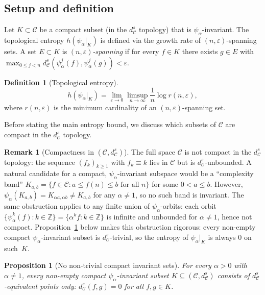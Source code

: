 \documentclass[11pt,a4paper]{article}
\theoremstyle{plain}
\newtheorem{propositioninner}[theoreminner]{Proposition}
\theoremstyle{definition}
\newtheorem{definitioninner}[theoreminner]{Definition}
\newtheorem{remarkinner}[theoreminner]{Remark}
\newenvironment{proposition}[1][]{\begin{propositioninner}[#1]}{\end{propositioninner}}
\newenvironment{definition}[1][]{\begin{definitioninner}[#1]}{\end{definitioninner}}
\newenvironment{remark}[1][]{\begin{remarkinner}[#1]}{\end{remarkinner}}
\newcommand{\Z}{\mathbb{Z}}
\newcommand{\C}{\mathcal{C}}
\newcommand{\eps}{\varepsilon}
\begin{document}
\subsection{Setup and definition}

Let $K\subset\C$ be a compact subset (in the $d_\C^s$ topology)
that is $\psi_\alpha$-invariant.  The topological entropy
$h(\psi_\alpha|_K)$ is defined via the growth rate of $(n,\eps)$-spanning
sets.  A set $E\subset K$ is \emph{$(n,\eps)$-spanning} if for every
$f\in K$ there exists $g\in E$ with
$\max_{0\le j<n}d_\C^s(\psi_\alpha^j(f),\psi_\alpha^j(g))<\eps$.

\begin{definition}[Topological entropy]
\[
  h(\psi_\alpha|_K)
  = \lim_{\eps\to 0}\limsup_{n\to\infty}\frac{1}{n}\log r(n,\eps),
\]
where $r(n,\eps)$ is the minimum cardinality of an
$(n,\eps)$-spanning set.
\end{definition}

Before stating the main entropy bound, we discuss which subsets of
$\C$ are compact in the $d_\C^s$ topology.

\begin{remark}[Compactness in $(\C,d_\C^s)$]\label{rem:compactness}
The full space $\C$ is not compact in the $d_\C^s$ topology: the
sequence $(f_k)_{k\ge 1}$ with $f_k\equiv k$ lies in $\C$ but is
$d_\C^s$-unbounded.  A natural candidate for a compact, $\psi_\alpha$-invariant
subspace would be a ``complexity band'' $K_{a,b}=\{f\in\C : a\le f(n)
\le b \text{ for all }n\}$ for some $0<a\le b$.  However,
$\psi_\alpha(K_{a,b})=K_{\alpha a,\alpha b}\ne K_{a,b}$ for any
$\alpha\ne 1$, so no such band is invariant.  The same obstruction
applies to any finite union of $\psi_\alpha$-orbits: each orbit
$\{\psi_\alpha^k(f):k\in\Z\}=\{\alpha^k f:k\in\Z\}$ is infinite and
unbounded for $\alpha\ne 1$, hence not compact.
Proposition~\ref{prop:no-compact-invariant} below makes this
obstruction rigorous: every non-empty compact $\psi_\alpha$-invariant
subset is $d_\C^s$-trivial, so the entropy of $\psi_\alpha|_K$ is
always $0$ on such~$K$.
\end{remark}

\begin{proposition}[No non-trivial compact invariant sets]\label{prop:no-compact-invariant}
For every $\alpha>0$ with $\alpha\ne 1$, every non-empty compact
$\psi_\alpha$-invariant subset $K\subseteq(\C,d_\C^s)$ consists of
$d_\C^s$-equivalent points only: $d_\C^s(f,g)=0$ for all $f,g\in K$.
\end{proposition}
\end{document}
